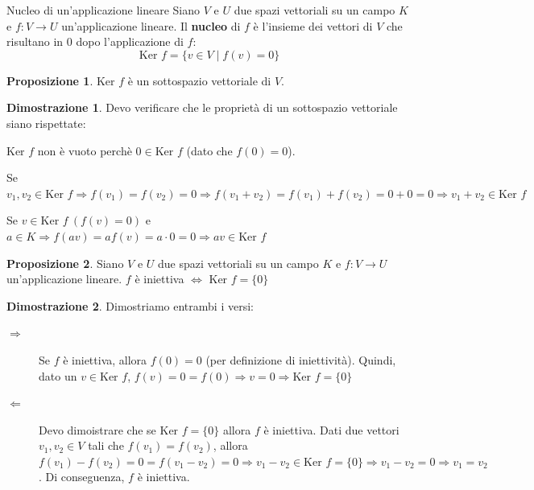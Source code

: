 \documentclass[a4paper]{article}
\theoremstyle{definition}
\newtheorem*{dimm}{Dimostrazione}
\newtheorem*{prop}{Proposizione}
\begin{document}
\begin{deff}{Nucleo di un'applicazione lineare}{}
	Siano $V$ e $U$ due spazi vettoriali su un campo $K$ e $f: V \rightarrow U$ un'applicazione lineare.
	Il \textbf{nucleo} di $f$ è l'insieme dei vettori di $V$ che risultano in $0$ dopo l'applicazione di $f$:
	\[ \text{Ker } f = \{v \in V \mid f(v) = 0\} \]
\end{deff}
\begin{prop}
	Ker $f$ è un sottospazio vettoriale di $V$.
\end{prop}
\begin{dimm}
	Devo verificare che le proprietà di un sottospazio vettoriale siano rispettate:
	\begin{description}
		\item Ker $f$ non è vuoto perchè $0 \in \text{Ker } f$ (dato che $f(0) = 0$).
		\item Se $v_1, v_2 \in \text{Ker } f \Rightarrow f(v_1) = f(v_2) = 0 \Rightarrow f(v_1 + v_2) = f(v_1) + f(v_2) = 0 + 0 = 0 \Rightarrow v_1 + v_2 \in \text{Ker } f$
		\item Se $v \in \text{Ker } f \ (f(v) = 0)$ e $a \in K \Rightarrow f(av) = af(v) = a \cdot 0 = 0 \Rightarrow av \in \text{Ker } f$
	\end{description}
\end{dimm}
\begin{prop}
	Siano $V$ e $U$ due spazi vettoriali su un campo $K$ e $f: V \rightarrow U$ un'applicazione lineare.
	$f$ è iniettiva $\Leftrightarrow$ Ker $f = \{0\}$
\end{prop}
\begin{dimm}
	Dimostriamo entrambi i versi:
	\begin{description}
		\item[$\Rightarrow$] Se $f$ è iniettiva, allora $f(0) = 0$ (per definizione di iniettività).
		      Quindi, dato un $v \in \text{Ker } f$, $f(v) = 0 = f(0) \Rightarrow v = 0 \Rightarrow \text{Ker } f = \{0\}$
		\item[$\Leftarrow$] Devo dimoistrare che se $\text{Ker } f = \{0\}$ allora $f$ è iniettiva.
		      Dati due vettori $v_1, v_2 \in V$ tali che $f(v_1) = f(v_2)$, allora $f(v_1) - f(v_2) = 0 = f(v_1 - v_2) = 0 \Rightarrow v_1 - v_2 \in \text{Ker } f = \{0\} \Rightarrow v_1 - v_2 = 0 \Rightarrow v_1 = v_2$.
		      Di conseguenza, $f$ è iniettiva.
	\end{description}
\end{dimm}
\end{document}
